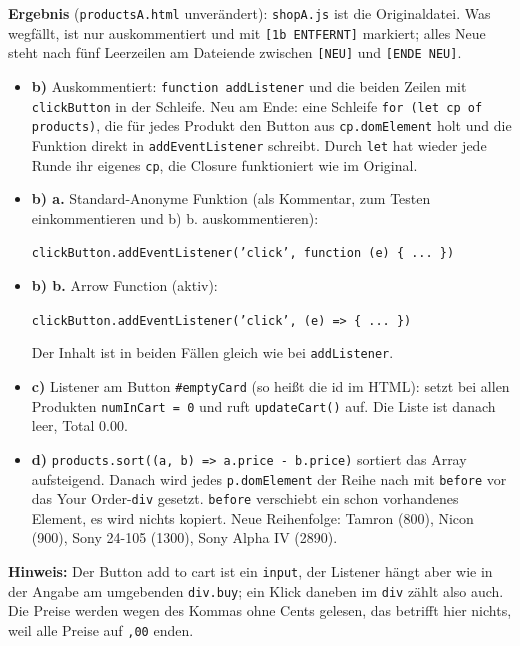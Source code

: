 \documentclass[11pt,a4paper]{article}
\begin{document}
\medskip
\textbf{Ergebnis} (\texttt{productsA.html} unverändert): \texttt{shopA.js}
ist die Originaldatei. Was wegfällt, ist nur auskommentiert und mit
\texttt{[1b ENTFERNT]} markiert; alles Neue steht nach fünf Leerzeilen am
Dateiende zwischen \texttt{[NEU]} und \texttt{[ENDE NEU]}.
\begin{itemize}
  \item \textbf{b)} Auskommentiert: \texttt{function addListener} und die
    beiden Zeilen mit \texttt{clickButton} in der Schleife. Neu am Ende: eine Schleife
    \texttt{for (let cp of products)}, die für jedes Produkt den Button aus
    \texttt{cp.domElement} holt und die Funktion direkt in
    \texttt{addEventListener} schreibt. Durch \texttt{let} hat wieder jede
    Runde ihr eigenes \texttt{cp}, die Closure funktioniert wie im Original.
  \item \textbf{b) a.} Standard-Anonyme Funktion (als Kommentar, zum Testen
    einkommentieren und b) b. auskommentieren):
    \begin{center}\texttt{clickButton.addEventListener('click', function (e) \{ ... \})}\end{center}
  \item \textbf{b) b.} Arrow Function (aktiv):
    \begin{center}\texttt{clickButton.addEventListener('click', (e) => \{ ... \})}\end{center}
    Der Inhalt ist in beiden Fällen gleich wie bei \texttt{addListener}.
  \item \textbf{c)} Listener am Button \texttt{\#emptyCard} (so heißt die id
    im HTML): setzt bei allen Produkten \texttt{numInCart = 0} und ruft
    \texttt{updateCart()} auf. Die Liste ist danach leer, Total 0.00.
  \item \textbf{d)} \texttt{products.sort((a, b) => a.price - b.price)}
    sortiert das Array aufsteigend. Danach wird jedes
    \texttt{p.domElement} der Reihe nach mit \texttt{before} vor das
    \glqq Your Order\grqq-\texttt{div} gesetzt. \texttt{before} verschiebt
    ein schon vorhandenes Element, es wird nichts kopiert. Neue Reihenfolge:
    Tamron (800), Nicon (900), Sony 24-105 (1300), Sony Alpha IV (2890).
\end{itemize}

\textbf{Hinweis:} Der Button \glqq add to cart\grqq{} ist ein
\texttt{input}, der Listener hängt aber wie in der Angabe am umgebenden
\texttt{div.buy}; ein Klick daneben im \texttt{div} zählt also auch. Die
Preise werden wegen des Kommas ohne Cents gelesen, das betrifft hier
nichts, weil alle Preise auf \texttt{,00} enden.
\end{document}
